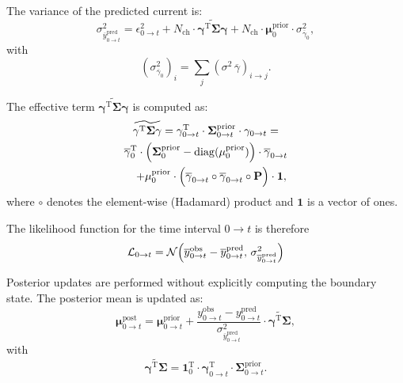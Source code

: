 \documentclass[pdflatex,sn-nature]{sn-jnl}%
\begin{document}
The variance of the predicted current is:
\begin{equation}
	\sigma^2_{\overline{y}^{\text{pred}}_{0 \rightarrow t}} = \epsilon^2_{0 \rightarrow t} + N_{\text{ch}} \cdot \widetilde{\mathbf{\gamma}^{\mathrm{T}} \mathbf{\Sigma}\mathbf{\gamma}} + N_{\text{ch}} \cdot \mathbf{\mu}^{\text{prior}}_{0} \cdot \sigma^2_{\overline{\gamma}_{0}},
	\label{eq:macro_interval_sigma_pred}
\end{equation}
with
\begin{equation}
	(\sigma^2_{\overline{\gamma}_{0}})_i = \sum_j (\sigma^2\,\overline{\gamma})_{i \rightarrow j}.
\end{equation}

The effective term \( \widetilde{\mathbf{\gamma}^{\mathrm{T}} \mathbf{\Sigma}\mathbf{\gamma}} \) is computed as:
\begin{multline}
	\widetilde{\mathbf{\gamma}^{\mathrm{T}} \mathbf{\Sigma}\mathbf{\gamma}} = \mathbf{\gamma}^{\mathrm{T}}_{0 \rightarrow t} \cdot \mathbf{\Sigma}^{\text{prior}}_{0 \rightarrow t} \cdot \mathbf{\gamma}_{0 \rightarrow t} = \\
	\overline{\mathbf{\gamma}}_{0}^{\mathrm{T}} \cdot \Bigl( \mathbf{\Sigma}^{\text{prior}}_{0} - \mathrm{diag}(\mathbf{\mu}^{\text{prior}}_0) \Bigr) \cdot \overline{\mathbf{\gamma}}_{0 \rightarrow t} \\
	\quad + \mathbf{\mu}^{\text{prior}}_0 \cdot \Bigl( \overline{\mathbf{\gamma}}_{0 \rightarrow t} \circ \overline{\mathbf{\gamma}}_{0 \rightarrow t} \circ \mathbf{P} \Bigr) \cdot \mathbf{1},
	\label{eq:simplified_boundary_state}
\end{multline}
where \( \circ \) denotes the element-wise (Hadamard) product and \( \mathbf{1} \) is a vector of ones.

The likelihood function for the time interval $0 \rightarrow t$ is therefore
\begin{equation}
\mathcal{L}_{0 \rightarrow t} = \mathcal{N}\Bigl( \overline{y}^{\text{obs}}_{0 \rightarrow t} - \overline{y}^{\text{pred}}_{0 \rightarrow t},\, \sigma^2_{\overline{y}^{\text{pred}}_{0 \rightarrow t}} \Bigr)
\label{eq:macroIR_likelihood}
\end{equation}

Posterior updates are performed without explicitly computing the boundary state. The posterior mean is updated as:
\begin{equation}
	\mathbf{\mu}^{\text{post}}_{0 \rightarrow t} = \mathbf{\mu}^{\text{prior}}_{0 \rightarrow t} + \frac{y^{\text{obs}}_{0 \rightarrow t} - y^{\text{pred}}_{0 \rightarrow t}}{\sigma^2_{\overline{y}^{\text{pred}}_{0 \rightarrow t}}} \cdot \widetilde{\boldsymbol{\gamma}^{\mathrm{T}} \boldsymbol{\Sigma}},
	\label{eq:macro_interval_posterior_mean}
\end{equation}
with
\begin{equation}
	\widetilde{\boldsymbol{\gamma}^{\mathrm{T}} \boldsymbol{\Sigma}} = \mathbf{1}_0^{\mathrm{T}} \cdot \mathbf{\gamma}^{\mathrm{T}}_{0 \rightarrow t} \cdot \mathbf{\Sigma}^{\text{prior}}_{0 \rightarrow t}.
	\label{eq:interval_gamma_sigma}
\end{equation}
\end{document}
